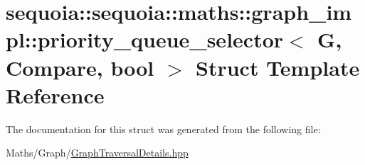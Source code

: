 \hypertarget{structsequoia_1_1sequoia_1_1maths_1_1graph__impl_1_1priority__queue__selector}{}\section{sequoia\+::sequoia\+::maths\+::graph\+\_\+impl\+::priority\+\_\+queue\+\_\+selector$<$ G, Compare, bool $>$ Struct Template Reference}
\label{structsequoia_1_1sequoia_1_1maths_1_1graph__impl_1_1priority__queue__selector}


The documentation for this struct was generated from the following file\+:\begin{DoxyCompactItemize}
\item 
Maths/\+Graph/\mbox{\hyperlink{_graph_traversal_details_8hpp}{Graph\+Traversal\+Details.\+hpp}}\end{DoxyCompactItemize}
